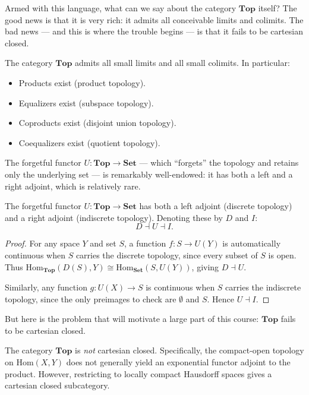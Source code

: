 Armed with this language, what can we say about the category $\mathbf{Top}$
itself? The good news is that it is very rich: it admits all conceivable
limits and colimits. The bad news --- and this is where the trouble begins
--- is that it fails to be cartesian closed.

\begin{theorem}
The category $\mathbf{Top}$ admits all small limits and all small colimits. In particular:
\begin{itemize}
  \item Products exist (product topology).
  \item Equalizers exist (subspace topology).
  \item Coproducts exist (disjoint union topology).
  \item Coequalizers exist (quotient topology).
\end{itemize}
\end{theorem}

The forgetful functor $U\colon \mathbf{Top} \to \mathbf{Set}$ --- which
``forgets'' the topology and retains only the underlying set --- is
remarkably well-endowed: it has both a left and a right adjoint, which is
relatively rare.

\begin{proposition}
The forgetful functor $U\colon \mathbf{Top} \to \mathbf{Set}$ has both a left adjoint
(discrete topology) and a right adjoint (indiscrete topology). Denoting these by $D$
and $I$:
\[
  D \dashv U \dashv I.
\]
\end{proposition}

\begin{proof}
For any space $Y$ and set $S$, a function $f\colon S \to U(Y)$ is automatically continuous
when $S$ carries the discrete topology, since every subset of $S$ is open. Thus
$\mathrm{Hom}_\mathbf{Top}(D(S),Y) \cong \mathrm{Hom}_\mathbf{Set}(S,U(Y))$, giving
$D \dashv U$.

Similarly, any function $g\colon U(X) \to S$ is continuous when $S$ carries the indiscrete
topology, since the only preimages to check are $\emptyset$ and $S$. Hence $U \dashv I$.
\end{proof}

But here is the problem that will motivate a large part of this course:
$\mathbf{Top}$ fails to be cartesian closed.

\begin{theorem}
The category $\mathbf{Top}$ is \emph{not} cartesian closed. Specifically, the
compact-open topology on $\mathrm{Hom}(X,Y)$ does not generally yield an exponential
functor adjoint to the product. However, restricting to locally compact Hausdorff
spaces gives a cartesian closed subcategory.
\end{theorem}

